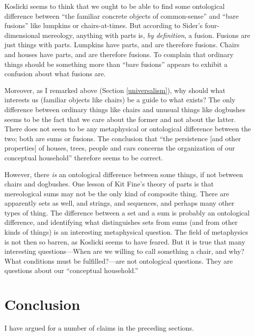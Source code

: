 \documentclass[12pt,twoside]{reedfancy}
\begin{document}
\begin{spacing}{1.25}
Koslicki seems to think that we ought to be able to find some
ontological difference between ``the familiar concrete objects of
common-sense'' and ``bare fusions'' like lumpkins or chairs-at-times.
But according to Sider's four-dimensional mereology, anything with
parts is, {\em by definition}, a fusion.  Fusions are just things with
parts.  Lumpkins have parts, and are therefore fusions.  Chairs and
houses have parts, and are therefore fusions.  To complain that
ordinary things should be something more than ``bare fusions'' appears
to exhibit a confusion about what fusions are.

Moreover, as I remarked above (Section \ref{universalism}), why should
what interests us (familiar objects like chairs) be a guide to what
exists?  The only difference between ordinary things like chairs and
unusual things like dogbushes seems to be the fact that we care about
the former and not about the latter.  There does not seem to be any
metaphysical or ontological difference between the two; both are sums
or fusions.  The conclusion that ``the persistence [and other
  properties] of houses, trees, people and cars concerns the
organization of our conceptual household'' therefore seems to be
correct.

However, there {\em is} an ontological difference between some things,
if not between chairs and dogbushes.  One lesson of Kit Fine's theory
of parts is that mereological sums may not be the only kind of
composite thing.  There are apparently sets as well, and strings, and
sequences, and perhaps many other types of thing.  The difference
between a set and a sum is probably an ontological difference, and
identifying what distinguishes sets from sums (and from other kinds of
things) is an interesting metaphysical question.  The field of
metaphysics is not then so barren, as Koslicki seems to have feared.
But it is true that many interesting questions---When are we willing
to call something a chair, and why?  What conditions must be
fulfilled?---are not ontological questions.  They are questions about
our ``conceptual household.''


\chapter*{Conclusion}
\label{concl}

\fancyhead[CE]{\textit{\thetitle}}%
\fancyhead[CO]{\textit{\thetitle}}
\renewcommand{\headrulewidth}{0.0pt}

I have argued for a number of claims in the preceding sections.


\end{spacing}
\end{document}
